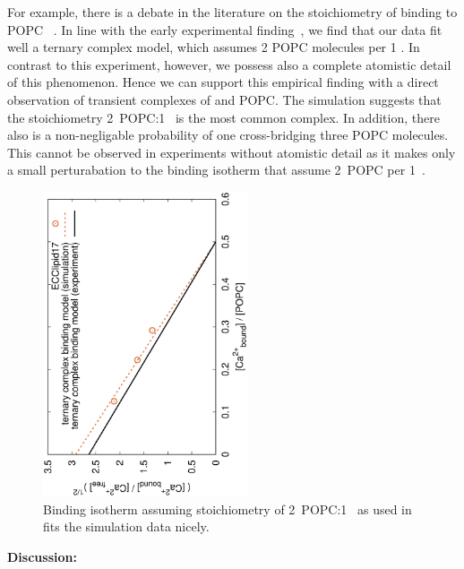 \documentclass[aip,jcp,twocolumn]{revtex4}
\begin{document}
For example, there is a debate in the literature on the stoichiometry of  binding to POPC~\cite{Altenbach84} . 
In line with the early experimental finding~\cite{Altenbach84}, we find that our data fit well a ternary complex model, which assumes 2 POPC molecules per 1 . 
In contrast to this experiment, however, we possess also a complete atomistic detail of this phenomenon.
Hence we can support this empirical finding with a direct observation of transient complexes of  and POPC.
The simulation suggests that the stoichiometry 2~POPC:1~ is the most common complex. 
In addition, there also is a non-negligable probability of one   cross-bridging three POPC molecules. 
This cannot be observed in experiments without atomistic detail as it makes only a small perturabation to the binding isotherm that assume 2~POPC per 1~. 

\begin{figure}[]
  \centering
  \includegraphics[height=9.0cm,angle=-90]{../Fig/bound-CAs_conc-eccl17.eps}
  \caption{\label{fig:cacl-bind}
    Binding isotherm assuming stoichiometry of 2~POPC:1~ as used in \cite{Altenbach84} fits the simulation data nicely.}
\end{figure}



\textbf{Discussion:}

\end{document}
